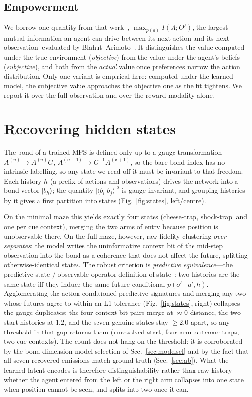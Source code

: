 \documentclass[runningheads]{llncs}
\begin{document}
\subsection{Empowerment}
We borrow one quantity from that work~\cite{wilsonAgency2025}, $\max_{p(a)} I(A;O')$,
the largest mutual information an agent can drive between its next action and its next
observation, evaluated by Blahut--Arimoto~\cite{salge2014}. It distinguishes the value
computed under the true environment (\emph{objective}) from the value under the agent's
beliefs (\emph{subjective}), and both from the \emph{actual} value once preferences
narrow the action distribution. Only one variant is empirical here: computed under the learned
model, the subjective value approaches the objective one as the fit tightens. We report
it over the full observation and over the reward modality alone.

\section{Recovering hidden states}\label{sec:states}

The bond of a trained MPS is defined only up to a gauge transformation
$A^{(n)}\!\to A^{(n)}G,\ A^{(n+1)}\!\to G^{-1}A^{(n+1)}$, so the bare bond index has no
intrinsic labelling, so any state we read off it must be invariant to that freedom.
Each history $h$ (a prefix of actions and observations) drives the network into a bond
vector $|b_h\rangle$; the quantity $|\langle b_i|b_j\rangle|^2$ is gauge-invariant, and
grouping histories by it gives a first partition into states
(Fig.~\ref{fig:states}, left/centre).

On the minimal maze this yields exactly four states (cheese-trap, shock-trap, and one
per cue context), merging the two arms of entry because position is unobservable
there. On the full maze, however, raw fidelity clustering \emph{over-separates}: the
model writes the uninformative context bit of the mid-step observation into the bond
as a coherence that does not affect the future, splitting otherwise-identical states.
The robust criterion is \emph{predictive equivalence}---the predictive-state /
observable-operator definition of state~\cite{hsu2012,srinivasan2021}: two histories
are the same state iff they induce the same future conditional
$p(o'\mid a',h)$. Agglomerating the action-conditioned predictive signatures and merging
any two whose futures agree to within an L1 tolerance (Fig.~\ref{fig:states}, right)
collapses the gauge duplicates: the four context-bit pairs merge at $\approx 0$
distance, the two start histories at $1.2$, and the seven genuine states stay $\ge 2.0$
apart, so any threshold in that gap returns them (unresolved start, four arm--outcome
traps, two cue contexts). The count does not hang on the threshold: it is corroborated
by the bond-dimension model selection of Sec.~\ref{sec:modelsel} and by the fact that
all seven recovered emissions match ground truth (Sec.~\ref{sec:ab}). What the learned
latent encodes is therefore distinguishability rather than raw history: whether the agent
entered from the left or the right arm collapses into one state when position cannot be
seen, and splits into two once it can.
\end{document}
